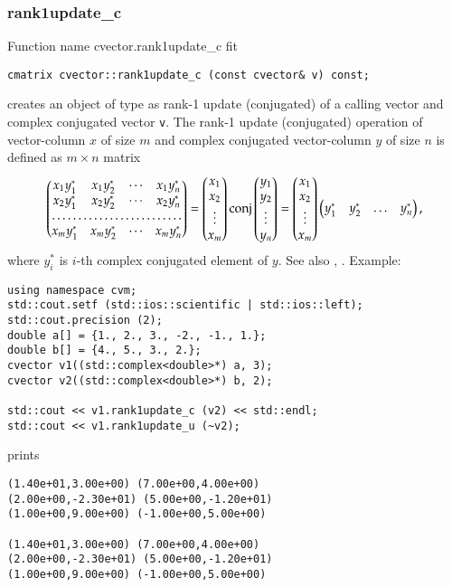 \subsubsection{rank1update\_c}
Function%
\pdfdest name {cvector.rank1update_c} fit
\begin{verbatim}
cmatrix cvector::rank1update_c (const cvector& v) const;
\end{verbatim}
creates an object of type 
as  rank-1 update (conjugated) of
a calling vector and  complex conjugated vector \verb"v".
The rank-1 update (conjugated)
operation of  vector-column $x$ of  size $m$ and
 complex conjugated
vector-column $y$ of  size $n$ is defined as $m\times n$ matrix
\begin{equation*}
\begin{pmatrix}
x_1 y_1^* & x_1 y_2^* & \cdots & x_1 y_n^* \\
x_2 y_1^* & x_2 y_2^* & \cdots & x_2 y_n^* \\
\hdotsfor{4} \\
x_m y_1^* & x_m y_2^* & \cdots & x_m y_n^*
\end{pmatrix} =
\begin{pmatrix}
x_1 \\
x_2 \\
\vdots \\
x_m
\end{pmatrix}
\conj\begin{pmatrix}
y_1 \\ y_2 \\ \vdots \\ y_n
\end{pmatrix} =
\begin{pmatrix}
x_1 \\
x_2 \\
\vdots \\
x_m
\end{pmatrix}
\begin{pmatrix}
y_1^* & y_2^* & \hdots & y_n^*
\end{pmatrix},
\end{equation*}
where $y_i^*$ is \hbox{$i$-th} complex conjugated element of $y$.
See also , .
Example:
\begin{Verbatim}
using namespace cvm;
std::cout.setf (std::ios::scientific | std::ios::left);
std::cout.precision (2);
double a[] = {1., 2., 3., -2., -1., 1.};
double b[] = {4., 5., 3., 2.};
cvector v1((std::complex<double>*) a, 3);
cvector v2((std::complex<double>*) b, 2);

std::cout << v1.rank1update_c (v2) << std::endl;
std::cout << v1.rank1update_u (~v2);
\end{Verbatim}
prints
\begin{Verbatim}
(1.40e+01,3.00e+00) (7.00e+00,4.00e+00)
(2.00e+00,-2.30e+01) (5.00e+00,-1.20e+01)
(1.00e+00,9.00e+00) (-1.00e+00,5.00e+00)

(1.40e+01,3.00e+00) (7.00e+00,4.00e+00)
(2.00e+00,-2.30e+01) (5.00e+00,-1.20e+01)
(1.00e+00,9.00e+00) (-1.00e+00,5.00e+00)
\end{Verbatim}
\newpage




